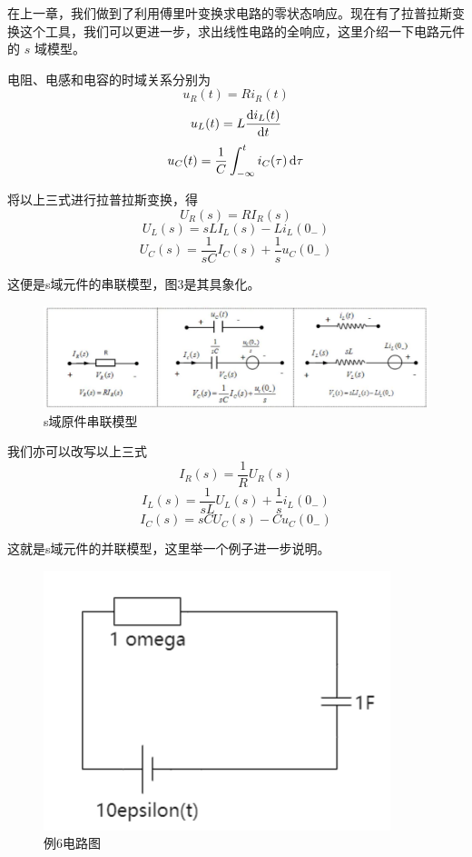 \documentclass[UTF8,a4paper,11pt]{article}
\begin{document}
在上一章，我们做到了利用傅里叶变换求电路的零状态响应。现在有了拉普拉斯变换这个工具，我们可以更进一步，求出线性电路的全响应，这里介绍一下电路元件的 $s$ 域模型。

电阻、电感和电容的时域关系分别为
\begin{equation}
u_R(t)=Ri_R(t)
\end{equation}
\begin{equation}
u_L(t)=L\frac{{\rm d}i_L(t)}{{\rm d}t}
\end{equation}
\begin{equation}
u_C(t)=\frac{1}{C}\int_{-\infty}^t {i_C(\tau)} \,{\rm d}\tau
\end{equation}

将以上三式进行拉普拉斯变换，得
\begin{equation}
U_R(s)=RI_R(s)
\end{equation}
\begin{equation}
U_L(s)=sLI_L(s)-Li_L(0_-)
\end{equation}
\begin{equation}
U_C(s)=\frac{1}{sC}I_C(s)+\frac{1}{s}u_C(0_-)
\end{equation}

这便是s域元件的串联模型，图3是其具象化。
\begin{figure}[htbp]
\centering
\includegraphics[scale=0.6]{p2.png}
\caption{s域原件串联模型}
\end{figure}

我们亦可以改写以上三式
\begin{equation}
I_R(s)=\frac{1}{R}U_R(s)
\end{equation}
\begin{equation}
I_L(s)=\frac{1}{sL}U_L(s)+\frac{1}{s}i_L(0_-)
\end{equation}
\begin{equation}
I_C(s)=sCU_C(s)-Cu_C(0_-)
\end{equation}

这就是s域元件的并联模型，这里举一个例子进一步说明。

\begin{figure}[htbp]
\centering
\includegraphics{p4.png}
\caption{例6电路图}
\end{figure}
\end{document}
